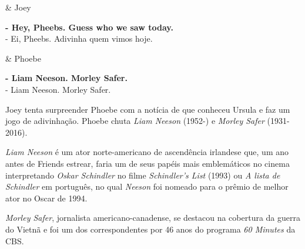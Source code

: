 \begin{tcolorbox}[enhanced,center upper,
    drop fuzzy shadow southeast, boxrule=0.3pt,
    lower separated=false,
    colframe=black!30!dialogoBorder,colback=white]
\begin{minipage}[c]{0.16\linewidth}
   & \centering \scriptsize{Joey}
\end{minipage}
\hfill
\begin{minipage}[c]{0.8\linewidth}
  \textbf{- Hey, Pheebs. Guess who we saw today.}\\
  - Ei, Pheebs. Adivinha quem vimos hoje.
\end{minipage}

\medskip
\begin{minipage}[c]{0.16\linewidth}
   & \centering \scriptsize{Phoebe}
\end{minipage}
\hfill
\begin{minipage}[c]{0.8\linewidth}
  \textbf{- Liam Neeson. Morley Safer.}\\
  - Liam Neeson. Morley Safer.
\end{minipage}
\end{tcolorbox}

Joey tenta surpreender Phoebe com a notícia de que conheceu Ursula e faz
um jogo de adivinhação. Phoebe chuta \emph{Liam Neeson} (1952-) e
\emph{Morley Safer} (1931-2016).

\emph{Liam Neeson} é um ator norte-americano de ascendência irlandese
que, um ano antes de Friends estrear, faria um de seus papéis mais
emblemáticos no cinema interpretando \emph{Oskar Schindler} no filme
\emph{Schindler's List} (1993) ou \emph{A lista de Schindler} em
português, no qual \emph{Neeson} foi nomeado para o prêmio de melhor
ator no Oscar de 1994.

\emph{Morley Safer}, jornalista americano-canadense, se destacou na
cobertura da guerra do Vietnã e foi um dos correspondentes por 46 anos
do programa \emph{60 Minutes} da CBS.

